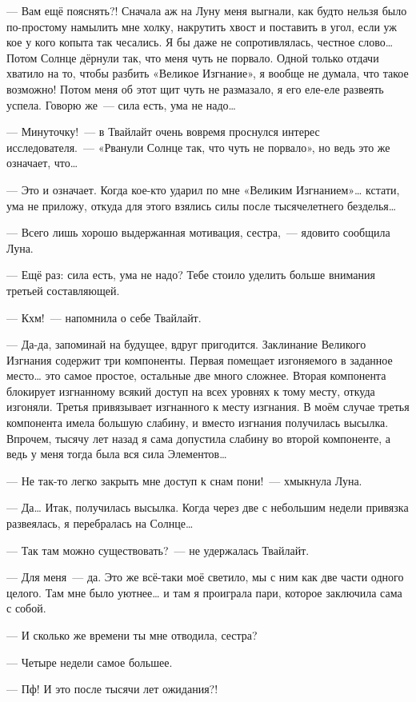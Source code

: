 \documentclass[twoside,a5paper,12pt]{extbook}
\begin{document}
— Вам ещё пояснять?! Сначала аж на Луну меня выгнали, как будто нельзя было по-простому намылить мне холку, накрутить хвост и поставить в угол, если уж кое у кого копыта так чесались. Я бы даже не сопротивлялась, честное слово… Потом Солнце дёрнули так, что меня чуть не порвало. Одной только отдачи хватило на то, чтобы разбить «Великое Изгнание», я вообще не думала, что такое возможно! Потом меня об этот щит чуть не размазало, я его еле-еле развеять успела. Говорю же — сила есть, ума не надо…

— Минуточку! — в Твайлайт очень вовремя проснулся интерес исследователя. — «Рванули Солнце так, что чуть не порвало», но ведь это же означает, что…

— Это и означает. Когда кое-кто ударил по мне «Великим Изгнанием»… кстати, ума не приложу, откуда для этого взялись силы после тысячелетнего безделья…

— Всего лишь хорошо выдержанная мотивация, сестра, — ядовито сообщила Луна.

— Ещё раз: сила есть, ума не надо? Тебе стоило уделить больше внимания третьей составляющей.

— Кхм! — напомнила о себе Твайлайт.

— Да-да, запоминай на будущее, вдруг пригодится. Заклинание Великого Изгнания содержит три компоненты. Первая помещает изгоняемого в заданное место… это самое простое, остальные две много сложнее. Вторая компонента блокирует изгнанному всякий доступ на всех уровнях к тому месту, откуда изгоняли. Третья привязывает изгнанного к месту изгнания. В моём случае третья компонента имела большую слабину, и вместо изгнания получилась высылка. Впрочем, тысячу лет назад я сама допустила слабину во второй компоненте, а ведь у меня тогда была вся сила Элементов…

— Не так-то легко закрыть мне доступ к снам пони! — хмыкнула Луна.

— Да… Итак, получилась высылка. Когда через две с небольшим недели привязка развеялась, я перебралась на Солнце…

— Так там можно существовать? — не удержалась Твайлайт.

— Для меня — да. Это же всё-таки моё светило, мы с ним как две части одного целого. Там мне было уютнее… и там я проиграла пари, которое заключила сама с собой.

— И сколько же времени ты мне отводила, сестра?

— Четыре недели самое большее.

— Пф! И это после тысячи лет ожидания?!
\end{document}
